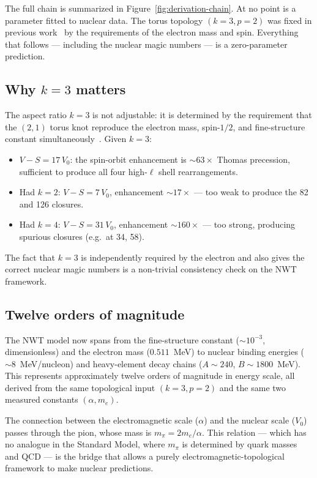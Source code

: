 \documentclass[11pt,a4paper]{article}
\begin{document}
The full chain is summarized in Figure~\ref{fig:derivation-chain}.
At no point is a parameter fitted to nuclear data.  The torus topology
$(k=3, p=2)$ was fixed in previous work~\cite{paper1,paper2} by the
requirements of the electron mass and spin.  Everything that follows ---
including the nuclear magic numbers --- is a zero-parameter prediction.

\subsection{Why $k=3$ matters}

The aspect ratio $k=3$ is not adjustable: it is determined by the requirement
that the $(2,1)$ torus knot reproduce the electron mass, spin-$1/2$, and
fine-structure constant simultaneously~\cite{paper2}.  Given $k=3$:
\begin{itemize}
  \item $V - S = 17\,V_0$: the spin-orbit enhancement is $\sim 63\times$
        Thomas precession, sufficient to produce all four high-$\ell$
        shell rearrangements.
  \item Had $k = 2$: $V - S = 7\,V_0$, enhancement $\sim 17\times$ ---
        too weak to produce the 82 and 126 closures.
  \item Had $k = 4$: $V - S = 31\,V_0$, enhancement $\sim 160\times$ ---
        too strong, producing spurious closures (e.g.\ at 34, 58).
\end{itemize}
The fact that $k = 3$ is independently required by the electron and also
gives the correct nuclear magic numbers is a non-trivial consistency check
on the NWT framework.

\subsection{Twelve orders of magnitude}

The NWT model now spans from the fine-structure constant ($\sim 10^{-3}$,
dimensionless) and the electron mass ($0.511$~MeV) to nuclear binding energies
($\sim 8$~MeV/nucleon) and heavy-element decay chains ($A \sim 240$,
$B \sim 1800$~MeV).  This represents approximately twelve orders of magnitude
in energy scale, all derived from the same topological input $(k=3, p=2)$
and the same two measured constants $(\alpha, m_e)$.

The connection between the electromagnetic scale ($\alpha$) and the nuclear
scale ($V_0$) passes through the pion, whose mass is $m_\pi = 2m_e/\alpha$.
This relation --- which has no analogue in the Standard Model, where $m_\pi$
is determined by quark masses and QCD --- is the bridge that allows a purely
electromagnetic-topological framework to make nuclear predictions.
\end{document}
